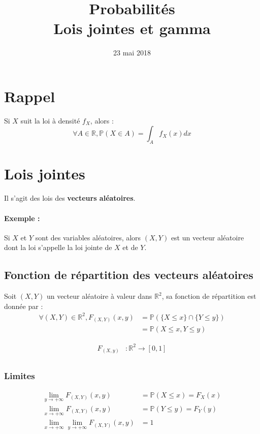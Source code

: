 \documentclass{article}
\title{%
  Probabilités \\
  \large Lois jointes et gamma}
\date{23 mai 2018}
\begin{document}
\maketitle

\section{Rappel}
Si $X$ suit la loi à densité $f_X$, alors :
$$ \forall A \in \mathbb{R}, \mathbb{P}(X \in A) = \int_A f_X (x) dx $$

\section{Lois jointes}

Il s'agit des lois des \textbf{vecteurs aléatoires}.

\paragraph{Exemple :} Si $X$ et $Y$ sont des variables aléatoires, alors
$(X, Y)$ est un vecteur aléatoire dont la loi s'appelle la loi jointe de $X$ et
de $Y$.

\subsection{Fonction de répartition des vecteurs aléatoires}

Soit $(X,Y)$ un vecteur aléatoire à valeur dans $\mathbb{R}^2$, sa fonction de
répartition est donnée par :
\begin{align*}
  \forall (X, Y) \in \mathbb{R}^2, F_{(X,Y)}(x,y) &= \mathbb{P}(\{X \leq x\} \cap \{Y \leq y\}) \\
  &= \mathbb{P}(X \leq x, Y \leq y)
\end{align*}

\begin{align*}
  F_{(X,y)} &: \mathbb{R}^2 \to [0,1] \\
\end{align*}

\subsubsection{Limites}
\begin{align*}
  \lim_{y \to +\infty}F_{(X,Y)}(x,y) &= \mathbb{P}(X \leq x) = F_X(x) \\
  \lim_{x \to +\infty}F_{(X,Y)}(x,y) &= \mathbb{P}(Y \leq y) = F_Y(y) \\
  \lim_{x \to +\infty} \lim_{y \to +\infty}F_{(X,Y)}(x,y) &= 1 \\
\end{align*}
\end{document}
